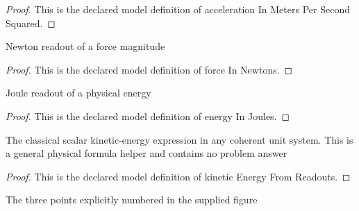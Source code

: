 \begin{proof}
  This is the declared model definition of acceleration In Meters Per Second Squared.
\end{proof}
\begin{definition}
  \label{def:physics:phyx-mini-0812:phyxminiproblems-problemphyxmini0812-forceinnewtons}
  Newton readout of a force magnitude
\end{definition}
\begin{proof}
  This is the declared model definition of force In Newtons.
\end{proof}
\begin{definition}
  \label{def:physics:phyx-mini-0812:phyxminiproblems-problemphyxmini0812-energyinjoules}
  Joule readout of a physical energy
\end{definition}
\begin{proof}
  This is the declared model definition of energy In Joules.
\end{proof}
\begin{definition}
  \label{def:physics:phyx-mini-0812:phyxminiproblems-problemphyxmini0812-kineticenergyfromreadouts}
  The classical scalar kinetic-energy expression in any coherent unit system. This is a general physical formula helper and contains no problem answer
\end{definition}
\begin{proof}
  This is the declared model definition of kinetic Energy From Readouts.
\end{proof}
\begin{definition}
  \label{def:physics:phyx-mini-0812:phyxminiproblems-problemphyxmini0812-ramppoint}
  The three points explicitly numbered in the supplied figure
\end{definition}
